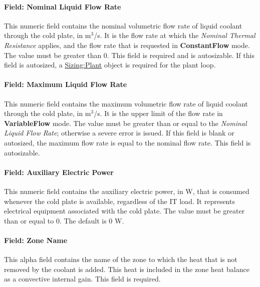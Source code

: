 \paragraph{Field: Nominal Liquid Flow Rate}\label{field-nominal-liquid-flow-rate-coilcoolingitecoldplate}

This numeric field contains the nominal volumetric flow rate of liquid coolant through the cold plate, in m\(^{3}\)/s. It is the flow rate at which the \emph{Nominal Thermal Resistance} applies, and the flow rate that is requested in \textbf{ConstantFlow} mode. The value must be greater than 0. This field is required and is autosizable. If this field is autosized, a \hyperref[sizingplant]{Sizing:Plant} object is required for the plant loop.

\paragraph{Field: Maximum Liquid Flow Rate}\label{field-maximum-liquid-flow-rate-coilcoolingitecoldplate}

This numeric field contains the maximum volumetric flow rate of liquid coolant through the cold plate, in m\(^{3}\)/s. It is the upper limit of the flow rate in \textbf{VariableFlow} mode. The value must be greater than or equal to the \emph{Nominal Liquid Flow Rate}; otherwise a severe error is issued. If this field is blank or autosized, the maximum flow rate is equal to the nominal flow rate. This field is autosizable.

\paragraph{Field: Auxiliary Electric Power}\label{field-auxiliary-electric-power-coilcoolingitecoldplate}

This numeric field contains the auxiliary electric power, in W, that is consumed whenever the cold plate is available, regardless of the IT load. It represents electrical equipment associated with the cold plate. The value must be greater than or equal to 0. The default is 0 W.

\paragraph{Field: Zone Name}\label{field-zone-name-coilcoolingitecoldplate}

This alpha field contains the name of the zone to which the heat that is not removed by the coolant is added. This heat is included in the zone heat balance as a convective internal gain. This field is required.

